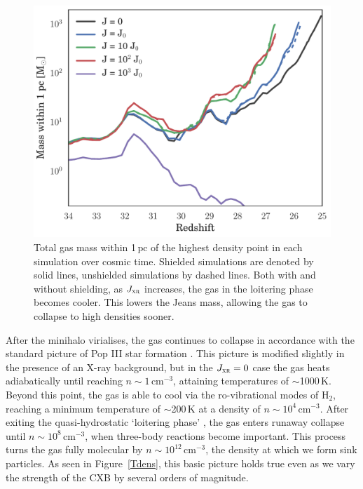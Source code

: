 \documentclass{thesis}
\newcommand{\kelvin}{\ensuremath{\,\mathrm{K}}\xspace}
\newcommand{\cc}{\ensuremath{\,\mathrm{cm}^{-3}}\xspace}
\newcommand{\pc}{\ensuremath{\,\mathrm{pc}}\xspace}
\newcommand{\htwo}{\ensuremath{\mathrm{H}_2}\xspace}
\newcommand{\jxr}{\ensuremath{J_{\textsc{xr}}}\xspace}
\newcommand{\about}{\ensuremath{\sim}}
\newcommand{\RefFig}[1]{\mbox{Figure~\ref{#1}}}
\begin{document}
\begin{figure}
  \begin{center}
    \includegraphics[width=\columnwidth]{figures/growth/collapse}
    \caption{Total gas mass within 1\pc of the highest density point in each simulation over cosmic time. Shielded simulations are denoted by solid lines, unshielded simulations by dashed lines.  Both with and without shielding, as \jxr increases, the gas in the loitering phase becomes cooler. This lowers the Jeans mass, allowing the gas to collapse to high densities sooner.}
    \label{fig:collapse}
  \end{center}
\end{figure}

After the minihalo virialises, the gas continues to collapse in accordance with the standard picture of Pop III star formation \citep[e.g.,][]{StacyGreifBromm2010, Greifetal2012, StacyBromm2013}. This picture is modified slightly in the presence of an X-ray background, but in the $\jxr=0$ case the gas heats adiabatically until reaching $n\sim1\cc$, attaining temperatures of $\sim$1000\kelvin. Beyond this point, the gas is able to cool via the ro-vibrational modes of \htwo, reaching a minimum temperature of \about200\kelvin at a density of $n\sim10^4\cc$.  After exiting the quasi-hydrostatic `loitering phase' \citep{BrommCoppiLarson2002}, the gas enters runaway collapse until $n\sim10^8\cc$, when three-body reactions become important.  This process turns the gas fully molecular by $n\sim10^{12}\cc$, the density at which we form sink particles. As seen in \RefFig{Tdens}, this basic picture holds true even as we vary the strength of the CXB by several orders of magnitude. 
\end{document}

